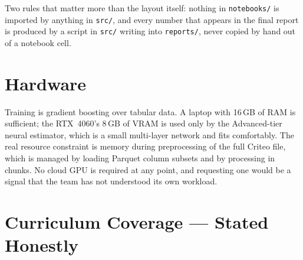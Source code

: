 \documentclass[11pt,a4paper]{article}
\begin{document}
Two rules that matter more than the layout itself: nothing in \texttt{notebooks/} is imported by
anything in \texttt{src/}, and every number that appears in the final report is produced by a script
in \texttt{src/} writing into \texttt{reports/}, never copied by hand out of a notebook cell.

\section{Hardware}

Training is gradient boosting over tabular data. A laptop with 16\,GB of RAM is sufficient; the
RTX~4060's 8\,GB of VRAM is used only by the Advanced-tier neural estimator, which is a small
multi-layer network and fits comfortably. The real resource constraint is memory during
preprocessing of the full Criteo file, which is managed by loading Parquet column subsets and by
processing in chunks. No cloud GPU is required at any point, and requesting one would be a signal
that the team has not understood its own workload.

\section{Curriculum Coverage --- Stated Honestly}
\label{sec:curriculum}
\end{document}
